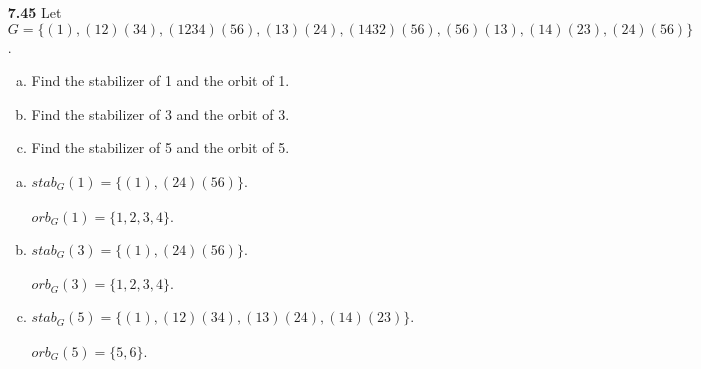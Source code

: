 \documentclass[11pt, oneside]{article}
\newcommand{\stab}{\operatorname{stab}}
\newcommand{\orb}{\operatorname{orb}}
\newtheorem*{theorem}{Theorem}
\begin{document}
\begin{enumerate}
\begin{theorem}[Orbit-Stabilizer] Let $G$ be a finite group of permutations of a set $S$. Then, for any $s\in S$, $$|G|=|\orb_G(s)|\,|\stab_G(s)|.$$
\end{theorem}
\begin{proof}
By Lagrange's Theorem:\begin{theorem}
 If $G$ is a finite group and $H$ is a subgroup of $G$, then $|H|$ divides $|G|$. Moreover, the number of distinct left (right) cosets of H in G is $|G| / |H|$.
\end{theorem}
Let $s\in S$ be arbitrary. Since we have proven that $stab_G(s)$ is a subgroup of G, thus:
\[|G|/ |stab_G(s)|=  \text{number of distinct left cosets of } stab_G(s)\]

Since we have shown that function $T_s$ from the set of left cosets of the stabilizer to the elements in the orbit of $s$ via the mapping $$T_s(\varphi\,\stab_G(s)) = \varphi(s).$$
is a well-defined bijection. Thus the cardinality of set of left cosets and orbit is the same. 
\[|G|/ |stab_G(s)|=|orb_G(s)| \]
\end{proof}

\newpage
\item[{\bf 7.45}]  Let $G =\{ (1), (12)(34), (1234)(56), (13)(24), (1432)(56), (56)(13), (14)(23), (24)(56)\}$. 
\begin{enumerate}[a)]
\item Find the stabilizer of 1 and the orbit of 1.
\item Find the stabilizer of 3 and the orbit of 3.
\item Find the stabilizer of 5 and the orbit of 5.
\end{enumerate}
\begin{enumerate}[a)]
\item $stab_G(1)=\{(1), (24)(56)\}.$\\ \\    
      $orb_G(1)=\{1, 2, 3, 4\}.$ \\
      
\item $stab_G(3)=\{(1), (24)(56)\}.$\\ \\
      $orb_G(3)=\{1, 2, 3, 4\}.$ \\
      
\item $stab_G(5)=\{(1), (12)(34), (13)(24), (14)(23)\}.$\\ \\
      $orb_G(5)=\{5, 6\}.$


\end{enumerate}
\end{enumerate}
\end{document}
